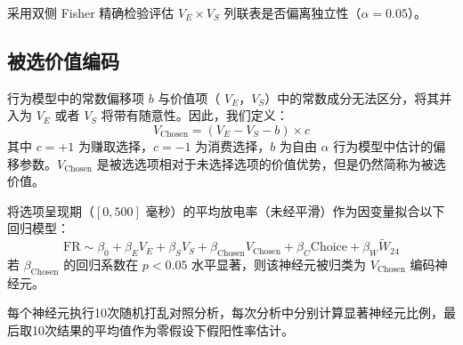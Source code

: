 采用双侧 Fisher 精确检验评估 $V_E \times V_S$ 列联表是否偏离独立性（$\alpha = 0.05$）。

\subsection{被选价值编码}\label{chap2:methods_neural_Vchosen}
行为模型中的常数偏移项 $b$ 与价值项（ $V_E$，$V_S$）中的常数成分无法区分，将其并入为 $V_E$ 或者 $V_S$ 将带有随意性。因此，我们定义：
\begin{equation}
    V_{\mathrm{Chosen}} = (V_E - V_S - b) \times c
\end{equation}
其中 $c = +1$ 为赚取选择，$c = -1$ 为消费选择，$b$ 为自由 $\alpha$ 行为模型中估计的偏移参数。$V_{\mathrm{Chosen}}$ 是被选选项相对于未选择选项的价值优势，但是仍然简称为被选价值。

将选项呈现期（$[0, 500]$ 毫秒）的平均放电率（未经平滑）作为因变量拟合以下回归模型：
\begin{equation}
    \mathrm{FR} \sim \beta_0 + \beta_E V_E + \beta_S V_S + \beta_{\mathrm{Chosen}} V_{\mathrm{Chosen}} + \beta_C \mathrm{Choice} + \beta_W \tilde{W}_{24}
\end{equation}
若 $\beta_{\mathrm{Chosen}}$ 的回归系数在 $p < 0.05$ 水平显著，则该神经元被归类为 $V_{\mathrm{Chosen}}$ 编码神经元。

每个神经元执行10次随机打乱对照分析，每次分析中分别计算显著神经元比例，最后取10次结果的平均值作为零假设下假阳性率估计。